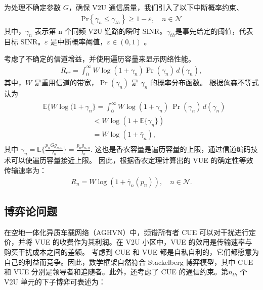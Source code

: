 为处理不确定参数 $G$，确保 V2U 通信质量，我们引入了以下中断概率约束、
\begin{eqnarray}\label{7}
\textrm{Pr}\left\{\gamma_{n} \leq \gamma_{th}\right\}\geq1-\varepsilon,\quad  n\in\mathcal{N}
\end{eqnarray}
其中，$\gamma_{n}$ 表示第 n 个同频 V2U 链路的瞬时 SINR。$\gamma_{th}$是事先给定的阈值，代表目标 SINR。$\varepsilon$ 是中断概率阈值，$\varepsilon \in (0,1)$ 。

考虑了不确定的信道增益，并使用遍历容量来显示网络性能。
\begin{eqnarray}\label{8}
R_{er}=\int_{0}^{\infty} W \log(1+\gamma_{n})\Pr(\gamma_{n})\, d(\gamma_{n}),
\end{eqnarray}
其中，$W$ 是重用信道的带宽，$\Pr(\gamma_{n})$ 是 $\gamma_{n}$ 的概率分布函数。 根据詹森不等式
认为
\begin{eqnarray}\label{9}
 \begin{array}{lll}
&\!\!\!\!\!\!\mathbb{E}\{W \log(1+\gamma_{n}\}=\int_{0}^{\infty} W \log(1+\gamma_{n})\ \Pr(\gamma_{n})\, d(\gamma_{n})\\
&\quad\quad\quad\quad\quad\quad\quad\!\!<W\log(1+\mathbb{E}\{\gamma_{n}\})\\
&\quad\quad\quad\quad\quad\quad\quad\!\!=W\log(1+\bar{\gamma}_{n}),
 \end{array}
\end{eqnarray}
其中 $\bar{\gamma}_{n}\!=\mathbb{E}\{\!\frac{p_{n}G g_{n,n}}{I_n}\}
\!=\!\frac{p_{n}g_{n,n}}{I_n}$. 这也是香农容量是遍历容量的上限，通过信道编码技术可以使遍历容量接近上限。
因此，根据香农定理计算出的 VUE 的确定性等效传输速率为：
\begin{eqnarray}\label{10}
R_{n}=W\log(1+\bar{\gamma}_{n}(p_n)),\quad  n\in\mathcal{N}.
\end{eqnarray}
\subsection{博弈论问题}\label{section2-2-1}
在空地一体化异质车载网络（AGHVN）中，频谱所有者 CUE 可以对干扰进行定价，并将 VUE 的收费作为其利润。在 V2U 小区中，VUE 的效用是传输速率与购买干扰成本之间的差额。
考虑到 CUE 和 VUE 都是自私自利的，它们都愿意为自己的利益而竞争。因此，数学框架自然符合 Stackelberg 博弈模型，其中 CUE 和 VUE 分别是领导者和追随者。此外，还考虑了
 CUE 的通信约束。第$n_{th}$ 个V2U 单元的下子博弈可表述为：


